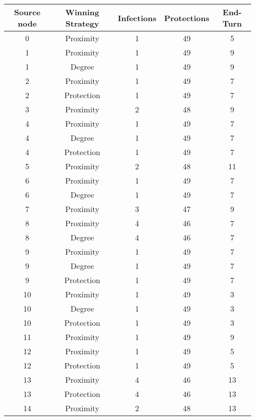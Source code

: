 \documentclass[results.tex]{subfiles}
\begin{document}
\begin{center}
  \begin{tabular}{| c || c | c | c | c |}
    \hline
    {\bfseries Source node} & {\bfseries Winning Strategy} & {\bfseries Infections} & {\bfseries Protections} & {\bfseries End-Turn} \\  %
    \hline\hline
    0 & Proximity & 1 & 49 & 5 \\ 
    \hline
    1 & Proximity & 1 & 49 & 9 \\ 
    \hline
    1 & Degree & 1 & 49 & 9 \\ 
    \hline
    2 & Proximity & 1 & 49 & 7 \\ 
    \hline
    2 & Protection & 1 & 49 & 7 \\ 
    \hline
    3 & Proximity & 2 & 48 & 9 \\ 
    \hline
    4 & Proximity & 1 & 49 & 7 \\ 
    \hline
    4 & Degree & 1 & 49 & 7 \\ 
    \hline
    4 & Protection & 1 & 49 & 7 \\ 
    \hline
    5 & Proximity & 2 & 48 & 11 \\ 
    \hline
    6 & Proximity & 1 & 49 & 7 \\ 
    \hline
    6 & Degree & 1 & 49 & 7 \\ 
    \hline
    7 & Proximity & 3 & 47 & 9 \\ 
    \hline
    8 & Proximity & 4 & 46 & 7 \\ 
    \hline
    8 & Degree & 4 & 46 & 7 \\ 
    \hline
    9 & Proximity & 1 & 49 & 7 \\ 
    \hline
    9 & Degree & 1 & 49 & 7 \\ 
    \hline
    9 & Protection & 1 & 49 & 7 \\ 
    \hline
    10 & Proximity & 1 & 49 & 3 \\ 
    \hline
    10 & Degree & 1 & 49 & 3 \\ 
    \hline
    10 & Protection & 1 & 49 & 3 \\ 
    \hline
    11 & Proximity & 1 & 49 & 9 \\ 
    \hline
    12 & Proximity & 1 & 49 & 5 \\ 
    \hline
    12 & Protection & 1 & 49 & 5 \\ 
    \hline
    13 & Proximity & 4 & 46 & 13 \\ 
    \hline
    13 & Protection & 4 & 46 & 13 \\ 
    \hline
    14 & Proximity & 2 & 48 & 13 \\ 

\end{tabular}
\end{center}
\end{document}
